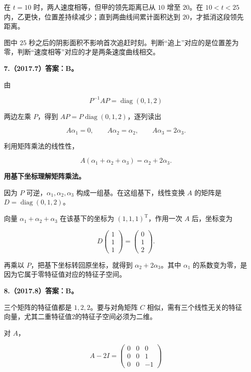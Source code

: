 \documentclass[UTF8,11pt,fontset=windows]{ctexart}
\begin{document}
在 $t=10$ 时，两人速度相等，但甲的领先距离已从 $10$ 增至 $20$。在 $10<t<25$ 内，乙更快，位置差持续减少；直到两曲线间累计面积达到 $20$，才抵消这段领先距离。

图中 $25$ 秒之后的阴影面积不影响首次追赶时刻。判断“追上”对应的是位置差为零，判断“速度相等”对应的才是两条速度曲线相交。

\clearpage

\textbf{7.（2017.7）答案：B。}

由

$$
P^{-1}AP=\operatorname{diag}(0,1,2)
$$

两边左乘 $P$，得到 $AP=P\operatorname{diag}(0,1,2)$，逐列读出

$$
A\alpha_1=0,\qquad A\alpha_2=\alpha_2,\qquad A\alpha_3=2\alpha_3.
$$

利用矩阵乘法的线性性，

$$
A(\alpha_1+\alpha_2+\alpha_3)=\alpha_2+2\alpha_3.
$$

\textbf{用基下坐标理解矩阵乘法。}

因为 $P$ 可逆，$\alpha_1,\alpha_2,\alpha_3$ 构成一组基。在这组基下，线性变换 $A$ 的矩阵是 $D=\operatorname{diag}(0,1,2)$。

向量 $\alpha_1+\alpha_2+\alpha_3$ 在该基下的坐标为 $(1,1,1)^{\mathrm T}$，作用一次 $A$ 后，坐标变为

$$
D\begin{pmatrix}1\\1\\1\end{pmatrix}
=\begin{pmatrix}0\\1\\2\end{pmatrix}.
$$

再乘以 $P$，把基下坐标转回原坐标，就得到 $\alpha_2+2\alpha_3$。其中 $\alpha_1$ 的系数变为零，是因为它属于零特征值对应的特征子空间。

\clearpage

\textbf{8.（2017.8）答案：B。}

三个矩阵的特征值都是 $1,2,2$。要与对角矩阵 $C$ 相似，需有三个线性无关的特征向量，尤其二重特征值2的特征子空间必须为二维。

对 $A$，

$$
A-2I=\begin{pmatrix}0&0&0\\0&0&1\\0&0&-1\end{pmatrix}
$$
\end{document}
